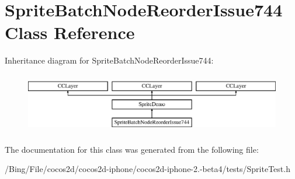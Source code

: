 \hypertarget{interface_sprite_batch_node_reorder_issue744}{\section{Sprite\-Batch\-Node\-Reorder\-Issue744 Class Reference}
\label{interface_sprite_batch_node_reorder_issue744}
}
Inheritance diagram for Sprite\-Batch\-Node\-Reorder\-Issue744\-:\begin{figure}[H]
\begin{center}
\leavevmode
\includegraphics[height=2.654028cm]{interface_sprite_batch_node_reorder_issue744}
\end{center}
\end{figure}


The documentation for this class was generated from the following file\-:\begin{DoxyCompactItemize}
\item 
/\-Bing/\-File/cocos2d/cocos2d-\/iphone/cocos2d-\/iphone-\/2.-\/beta4/tests/Sprite\-Test.\-h\end{DoxyCompactItemize}
